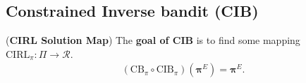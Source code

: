 

\subsection{Constrained Inverse bandit (CIB)} \label{sec:constrained_bandit_problem}

\begin{definition}
    \label{def:cib_sol_map}
    (\textbf{CIRL Solution Map})
    The \textbf{goal of CIB} is to find some mapping $\text{CIRL}_\pi : \Pi \rightarrow \mathcal{R}$.
    \begin{align*}
        (\text{CB}_\pi \circ \text{CIB}_\pi)(\bm{\pi}^E) = \bm{\pi}^E.
    \end{align*}
\end{definition}

